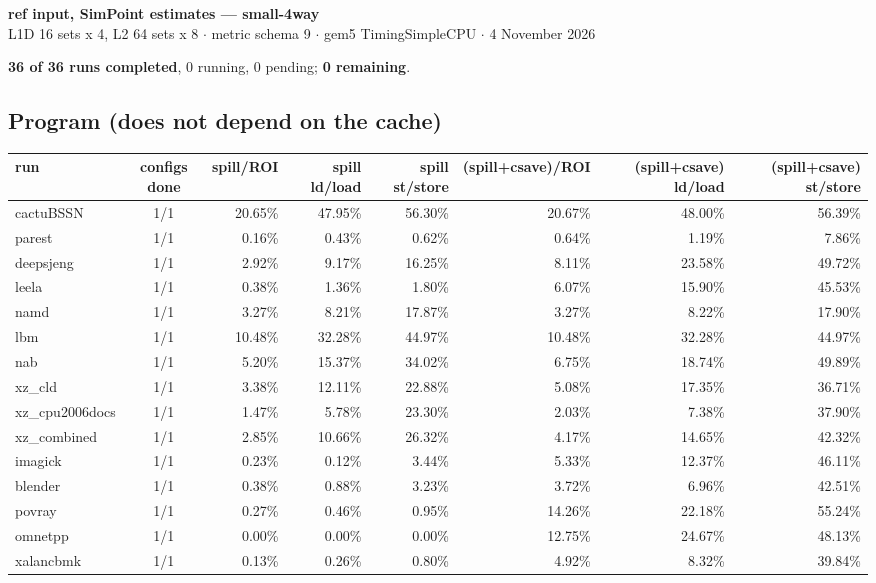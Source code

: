 \documentclass[10pt,a4paper,landscape]{article}
\begin{document}
\begin{center}
{\large\bfseries ref input, SimPoint estimates --- small-4way}\\[3pt]
{\small L1D 16 sets x 4, L2 64 sets x 8 $\cdot$ metric schema 9 $\cdot$ gem5 TimingSimpleCPU $\cdot$ 4 November 2026}
\end{center}
\textbf{36 of 36 runs completed}, 0 running, 0 pending; \textbf{0 remaining}.\par
\subsection*{Program (does not depend on the cache)}
{\footnotesize
\begin{longtable}{lcrrrrrr}
\toprule
run & configs done & spill/ROI & spill ld/load & spill st/store & (spill+csave)/ROI & (spill+csave) ld/load & (spill+csave) st/store \\
\midrule
\endhead
\bottomrule
\endfoot
cactuBSSN & 1/1 & 20.65\% & 47.95\% & 56.30\% & 20.67\% & 48.00\% & 56.39\% \\
parest & 1/1 & 0.16\% & 0.43\% & 0.62\% & 0.64\% & 1.19\% & 7.86\% \\
deepsjeng & 1/1 & 2.92\% & 9.17\% & 16.25\% & 8.11\% & 23.58\% & 49.72\% \\
leela & 1/1 & 0.38\% & 1.36\% & 1.80\% & 6.07\% & 15.90\% & 45.53\% \\
namd & 1/1 & 3.27\% & 8.21\% & 17.87\% & 3.27\% & 8.22\% & 17.90\% \\
lbm & 1/1 & 10.48\% & 32.28\% & 44.97\% & 10.48\% & 32.28\% & 44.97\% \\
nab & 1/1 & 5.20\% & 15.37\% & 34.02\% & 6.75\% & 18.74\% & 49.89\% \\
xz\_cld & 1/1 & 3.38\% & 12.11\% & 22.88\% & 5.08\% & 17.35\% & 36.71\% \\
xz\_cpu2006docs & 1/1 & 1.47\% & 5.78\% & 23.30\% & 2.03\% & 7.38\% & 37.90\% \\
xz\_combined & 1/1 & 2.85\% & 10.66\% & 26.32\% & 4.17\% & 14.65\% & 42.32\% \\
imagick & 1/1 & 0.23\% & 0.12\% & 3.44\% & 5.33\% & 12.37\% & 46.11\% \\
blender & 1/1 & 0.38\% & 0.88\% & 3.23\% & 3.72\% & 6.96\% & 42.51\% \\
povray & 1/1 & 0.27\% & 0.46\% & 0.95\% & 14.26\% & 22.18\% & 55.24\% \\
omnetpp & 1/1 & 0.00\% & 0.00\% & 0.00\% & 12.75\% & 24.67\% & 48.13\% \\
xalancbmk & 1/1 & 0.13\% & 0.26\% & 0.80\% & 4.92\% & 8.32\% & 39.84\% \\

\end{longtable}}
\end{document}
